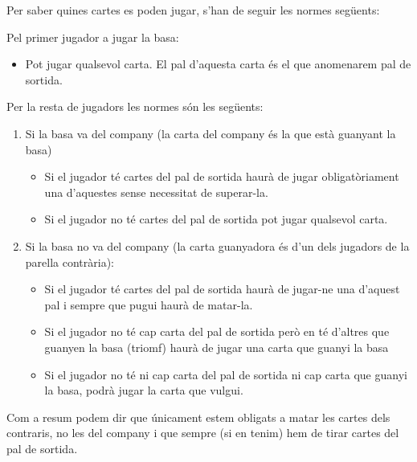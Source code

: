 Per saber quines cartes es poden jugar, s'han de seguir les normes següents:

Pel primer jugador a jugar la basa:

\begin{itemize}
    \item{Pot jugar qualsevol carta. El pal d'aquesta carta és el que anomenarem pal de sortida.}
\end{itemize}

Per la resta de jugadors les normes són les següents:
\begin{enumerate}
\item{Si la basa va del company (la carta del company és la que està guanyant la basa)
    \begin{itemize}
        \item{Si el jugador té cartes del pal de sortida haurà de jugar obligatòriament una d'aquestes sense necessitat de superar-la.}
        \item{Si el jugador no té cartes del pal de sortida pot jugar qualsevol carta.}
     \end{itemize}
}   
\item{Si la basa no va del company (la carta guanyadora és d'un dels jugadors de la parella contrària):
    \begin{itemize}
        \item{Si el jugador té cartes del pal de sortida haurà de jugar-ne una d'aquest pal i sempre que pugui haurà de matar-la.}
        \item{Si el jugador no té cap carta del pal de sortida però en té d'altres que guanyen la basa (triomf) haurà de jugar una carta que guanyi la basa}
        \item{Si el jugador no té ni cap carta del pal de sortida ni cap carta que guanyi la basa, podrà jugar la carta que vulgui.}
    \end{itemize}
}
\end{enumerate}
Com a resum podem dir que únicament estem obligats a matar les cartes dels contraris, no les del company i que sempre (si en tenim) hem de tirar cartes del pal de sortida.

